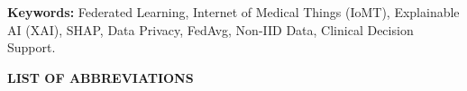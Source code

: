 \documentclass[12pt,a4paper,oneside]{report}
\begin{document}
\vspace{1.5em}
\noindent
\textbf{Keywords:} Federated Learning, Internet of Medical Things (IoMT), Explainable AI (XAI), SHAP, Data Privacy, FedAvg, Non-IID Data, Clinical Decision Support.

\clearpage
\tableofcontents

\clearpage
\listoffigures

\clearpage
\listoftables

\clearpage
\begin{center}
{\fontsize{14pt}{18pt}\bfseries\selectfont LIST OF ABBREVIATIONS}\\[1.5em]
\end{center}
\end{document}
